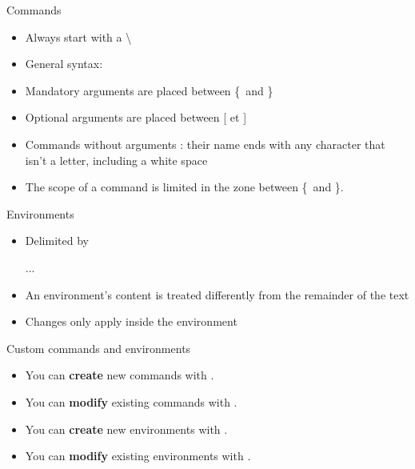 \begin{frame}[fragile]{Commands}
	\begin{itemize}
		\item Always start with a \textbackslash
		\item General syntax:
\begin{codesource}
	\nomcommande
\end{codesource}
		\item Mandatory arguments are placed between \{\ and \}
		\item Optional arguments are placed between [ et ]
		\item Commands without arguments : their name ends with any character that isn't a letter, including
			a white space
		\item The scope of a command is limited in the zone between \{\ and \}.
	\end{itemize}
\end{frame}

\begin{frame}[fragile,c]{Environments}
	\begin{itemize}
		\item Delimited by
\begin{codesource}
	\begin{environment}
		...
	\end{environment}
\end{codesource}
		\item An environment's content is treated differently from the remainder
			of the text
		\item Changes only apply inside the environment
	\end{itemize}
\end{frame}

\begin{frame}[c]{Custom commands and environments}
	\begin{itemize}
		\item You can \textbf{create} new commands with .
		\item You can \textbf{modify} existing commands with .
		\item You can \textbf{create} new environments with .
		\item You can \textbf{modify} existing environments with .
	\end{itemize}
\end{frame}